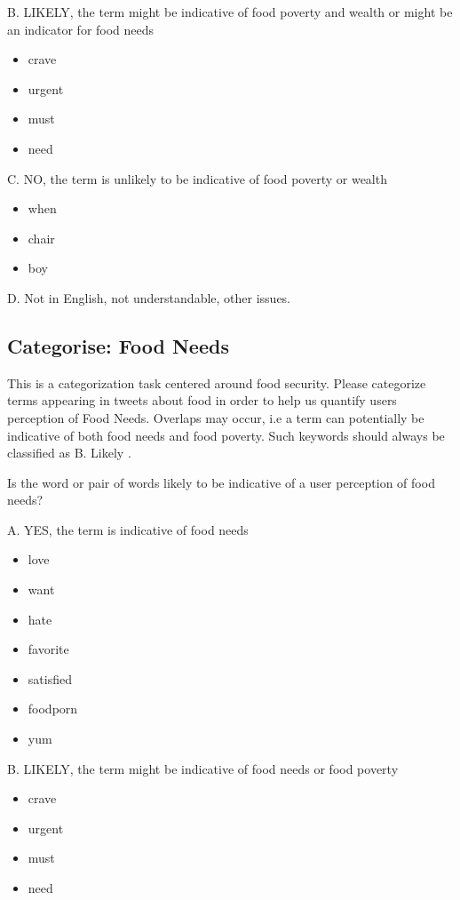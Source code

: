 B. LIKELY, the term might be indicative of food poverty and wealth or might be an indicator for food needs\begin{itemize}
  \item crave
  \item urgent
  \item must
  \item need 
\end{itemize}

C. NO, the term is unlikely to be indicative of food poverty or wealth

\begin{itemize}
  \item when
  \item chair
  \item boy
\end{itemize}

D. Not in English, not understandable, other issues.



\subsection{Categorise: Food Needs}

This is a categorization task centered around food security. Please categorize terms appearing in tweets about food in order to help us quantify users perception of Food Needs. Overlaps may occur, i.e a term can potentially be indicative of both food needs and food poverty. Such keywords should always be classified as B. Likely .

Is the word or pair of words likely to be indicative of a user perception of food needs?

A. YES, the term is indicative of food needs

\begin{itemize}
  \item love
  \item want
  \item hate
  \item favorite 
  \item satisfied
  \item foodporn
  \item yum


\end{itemize}

B. LIKELY, the term might be indicative of food needs or food poverty
\begin{itemize}
  \item crave
  \item urgent
  \item must
  \item need
\end{itemize}

